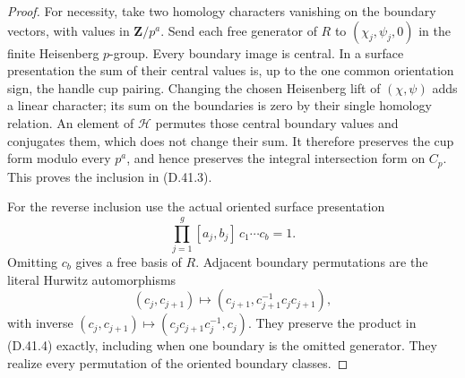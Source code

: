 \begin{proof}
For necessity, take two homology characters
vanishing on the boundary vectors, with values
in \(\mathbf Z/p^a\).
Send each free generator of \(R\) to
\((\chi_j,\psi_j,0)\) in the finite Heisenberg
\(p\)-group.  Every boundary image is central.
In a surface presentation the sum of their
central values is, up to the one common
orientation sign, the handle cup pairing.
Changing the chosen Heisenberg lift of
\((\chi,\psi)\) adds a linear character; its
sum on the boundaries is zero by their
single homology relation.
An element of \(\mathcal H\) permutes those
central boundary values and conjugates them,
which does not change their sum.
It therefore preserves the cup form modulo
every \(p^a\), and hence preserves the
integral intersection form on \(C_p\).
This proves the inclusion in
\textup{(D.41.3)}.

For the reverse inclusion use the actual
oriented surface presentation
\[
 \prod_{j=1}^g[a_j,b_j]\,c_1\cdots c_b=1.
 \tag{D.41.4}
\]
Omitting \(c_b\) gives a free basis of \(R\).
Adjacent boundary permutations are the literal
Hurwitz automorphisms
\[
 (c_j,c_{j+1})\longmapsto
    (c_{j+1},c_{j+1}^{-1}c_jc_{j+1}),
 \tag{D.41.5}
\]
with inverse
\((c_j,c_{j+1})\mapsto
(c_jc_{j+1}c_j^{-1},c_j)\).
They preserve the product in
\textup{(D.41.4)} exactly, including when one
boundary is the omitted generator.
They realize every permutation of the
oriented boundary classes.


\end{proof}
